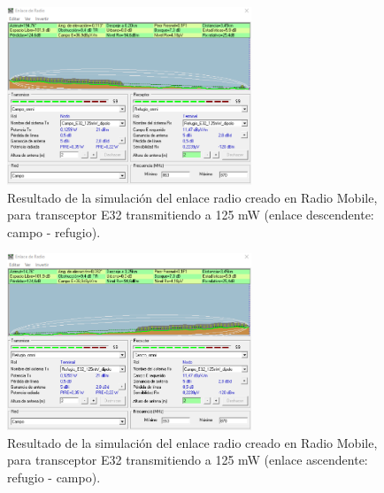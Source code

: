 \documentclass[12pt]{article}
\begin{document}
	\pagebreak
	
	
	\begin{figure}[h!]
		\begin{center}
			\includegraphics[width=0.65\textwidth]{img/resultado_e32_125mW_desc.png}
			\caption{Resultado de la simulación del enlace radio creado en Radio Mobile, para transceptor E32 transmitiendo a 125 mW (enlace descendente: campo - refugio).}
			\label{fig: resultado enlace e32 125mW descendente radio mobile}
		\end{center}
	\end{figure}
	
	
	\begin{figure}[h!]
		\begin{center}
			\includegraphics[width=0.65\textwidth]{img/resultado_e32_125mW_asc.png}
			\caption{Resultado de la simulación del enlace radio creado en Radio Mobile, para transceptor E32 transmitiendo a 125 mW (enlace ascendente: refugio - campo).}
			\label{fig: resultado enlace e32 125mW ascendente radio mobile}
		\end{center}
	\end{figure}
	
	\pagebreak
	
\end{document}
